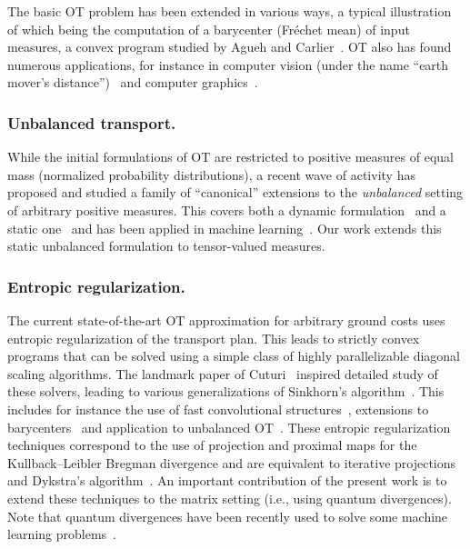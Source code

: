 The basic OT problem has been extended in various ways, a typical illustration of which being the computation of a barycenter (Fr\'echet mean) of input measures, a convex program studied by Agueh and Carlier~.
%
OT also has found numerous applications, for instance in computer vision (under the name ``earth mover's distance'')~\cite{rubner-2000} and computer graphics~\cite{bonneel-2011}. %


\subsubsection{Unbalanced transport.}

While the initial formulations of OT are restricted to positive measures of equal mass (normalized probability distributions), a recent wave of activity has proposed and studied a family of ``canonical'' extensions %
to the \emph{unbalanced} setting of arbitrary positive measures. This covers both a dynamic formulation~\cite{LieroMielkeSavareCourt,kondratyev2015,2016-chizat-focm} and a static one~\cite{LieroMielkeSavareLong,2015-chizat-unbalanced} and has been applied in machine learning~\cite{frogner-2015}. 
%
Our work extends this static unbalanced formulation to tensor-valued measures. 


\subsubsection{Entropic regularization.}

The current state-of-the-art OT approximation for arbitrary ground costs uses entropic regularization of the transport plan. This leads to strictly convex programs that can be solved using a simple class of highly parallelizable diagonal scaling algorithms. The landmark paper of Cuturi~ inspired detailed study of these solvers, leading to various generalizations of Sinkhorn's algorithm~. This includes for instance the use of fast convolutional structures~\cite{solomon-2015}, extensions to barycenters~\cite{benamou-2015} and application to unbalanced OT~\cite{frogner-2015,2016-chizat-sinkhorn}.
%
These entropic regularization techniques correspond to the use of projection and proximal maps for the Kullback--Leibler Bregman divergence and are equivalent to iterative projections~\cite{bregman-1967} and Dykstra's algorithm~\cite{Dykstra83,bauschke-lewis}. 
%
An important contribution of the present work is to extend these techniques to the matrix setting (i.e., using quantum divergences). Note that quantum divergences have been recently used to solve some machine learning problems~\cite{Dhillon2008,Kulis2009,Chandrasekaran2017}.%


